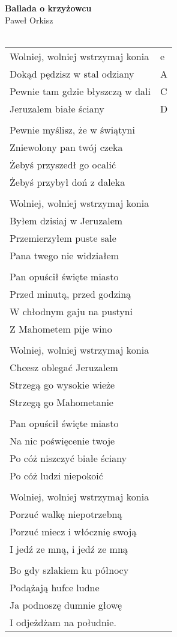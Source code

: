 \documentclass[a5paper]{article}
\begin{document}


\noindent
\fontsize{12pt}{15pt}\selectfont
\textbf{Ballada o krzyżowcu} \\
\fontsize{8pt}{10pt}\selectfont
Paweł Orkisz \\ \\
\fontsize{10pt}{12pt}\selectfont
{}
\begin{tabular}{@{}p{7.5cm}p{3cm}@{}}
\noindent
Wolniej, wolniej wstrzymaj konia & e \\
Dokąd pędzisz w stal odziany & A \\
Pewnie tam gdzie błyszczą w dali & C \\
Jeruzalem białe ściany & D \\ \\

Pewnie myślisz, że w świątyni \\
Zniewolony pan twój czeka \\
Żebyś przyszedł go ocalić \\
Żebyś przybył doń z daleka \\ \\

Wolniej, wolniej wstrzymaj konia\\
Byłem dzisiaj w Jeruzalem\\
Przemierzyłem puste sale\\
Pana twego nie widziałem\\\\

Pan opuścił święte miasto \\
Przed minutą, przed godziną\\
W chłodnym gaju na pustyni\\
Z Mahometem pije wino\\\\

Wolniej, wolniej wstrzymaj konia\\
Chcesz oblegać Jeruzalem\\
Strzegą go wysokie wieże\\
Strzegą go Mahometanie\\\\

Pan opuścił święte miasto\\
Na nic poświęcenie twoje\\
Po cóż niszczyć białe ściany\\
Po cóż ludzi niepokoić\\\\

Wolniej, wolniej wstrzymaj konia\\
Porzuć walkę niepotrzebną\\
Porzuć miecz i włócznię swoją\\
I jedź ze mną, i jedź ze mną\\\\

Bo gdy szlakiem ku północy\\
Podążają hufce ludne\\
Ja podnoszę dumnie głowę\\
I odjeżdżam na południe.
\end{tabular}
\end{document}
